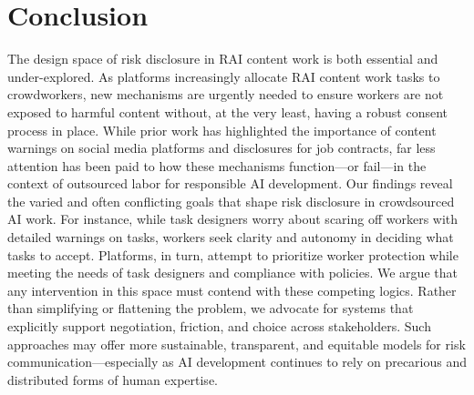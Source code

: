 \section{Conclusion}
The design space of risk disclosure in RAI content work is both essential and under-explored. As platforms increasingly allocate RAI content work tasks to crowdworkers, new mechanisms are urgently needed to ensure workers are not exposed to harmful content without, at the very least, having a robust consent process in place. While prior work has highlighted the importance of content warnings on social media platforms and disclosures for job contracts, far less attention has been paid to how these mechanisms function—or fail—in the context of outsourced labor for responsible AI development.  Our findings reveal the varied and often conflicting goals that shape risk disclosure in crowdsourced AI work. For instance, while task designers worry about scaring off workers with detailed warnings on tasks, workers seek clarity and autonomy in deciding what tasks to accept. Platforms, in turn, attempt to prioritize worker protection while meeting the needs of task designers and compliance with policies. We argue that any intervention in this space must contend with these competing logics. Rather than simplifying or flattening the problem, we advocate for systems that explicitly support negotiation, friction, and choice across stakeholders. Such approaches may offer more sustainable, transparent, and equitable models for risk communication---especially as AI development continues to rely on precarious and distributed forms of human expertise.